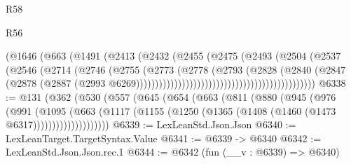 \begin{lexlean}{R58}
\begin{lexlean}{R56}
\begin{coremodule}
{{{{{{{{{{{{{{{{{{{{{{{{{{{{{{{{{{{{{{{{{{{{{{{{{{{{{{{{{{{{{{{{{{{{{{{{{{{{{{{{{{{{{{{{{{{{{{{{{{{{{{{{{{{{{{{{{{{{{{{{{{{{{{{{{{{{{{{{{{{{{{{{{{{{{{{{{{{{{{{{{{{{{{{{{{{{{{{{{{{{{{{{{{{{{{{{{{{{{{{{{{{{{{{{{{{                                                    (@1646
                                                      (@663
                                                        (@1491
                                                          (@2413
                                                            (@2432
                                                              (@2455
                                                                (@2475
                                                                  (@2493
                                                                    (@2504
                                                                      (@2537
                                                                        (@2546
                                                                          (@2714
                                                                            (@2746
                                                                              (@2755
                                                                                (@2773
                                                                                  (@2778
                                                                                    (@2793
                                                                                      (@2828
                                                                                        (@2840
                                                                                          (@2847
                                                                                            (@2878
                                                                                              (@2887
                                                                                                (@2993
                                                                                                  @6269)))))))))))))))))))))))))))))))))))))))))))))))
@6338 := @131
    (@362
      (@530
        (@557
          (@645
            (@654
              (@663
                (@811
                  (@880
                    (@945
                      (@976
                        (@991
                          (@1095
                            (@663
                              (@1117
                                (@1155 (@1250 (@1365 (@1408 (@1460 (@1473 @6317))))))))))))))))))))
@6339 := LexLeanStd.Json.Json
@6340 := LexLeanTarget.TargetSyntax.Value
@6341 := @6339 -> @6340
@6342 := LexLeanStd.Json.Json.rec.{1}
@6344 := @6342 (fun (__v : @6339) => @6340)
}}}}}}}}}}}}}}}}}}}}}}}}}}}}}}}}}}}}}}}}}}}}}}}}}}}}}}}}}}}}}}}}}}}}}}}}}}}}}}}}}}}}}}}}}}}}}}}}}}}}}}}}}}}}}}}}}}}}}}}}}}}}}}}}}}}}}}}}}}}}}}}}}}}}}}}}}}}}}}}}}}}}}}}}}}}}}}}}}}}}}}}}}}}}}}}}}}}}}}}}}}}}}}}}}}}
\end{coremodule}
\end{lexlean}
\end{lexlean}
